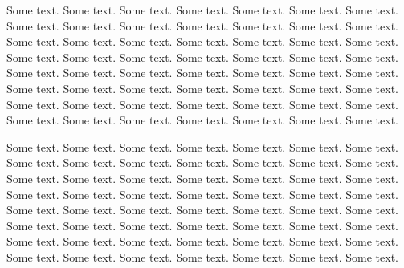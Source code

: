 \documentclass[oneside]{book}
\begin{document}
Some text. Some text. Some text. Some text. Some text. Some text. Some text. Some text. Some text. Some text. Some text. Some text. Some text. Some text. Some text. Some text. Some text. Some text. Some text. Some text. Some text. Some text. Some text. Some text. Some text. Some text. Some text. Some text. Some text. Some text. Some text. Some text. Some text. Some text. Some text. Some text. Some text. Some text. Some text. Some text. Some text. Some text. Some text. Some text. Some text. Some text. Some text. Some text. Some text. Some text. Some text. Some text. Some text. Some text. Some text. Some text. 

Some text. Some text. Some text. Some text. Some text. Some text. Some text. Some text. Some text. Some text. Some text. Some text. Some text. Some text. Some text. Some text. Some text. Some text. Some text. Some text. Some text. Some text. Some text. Some text. Some text. Some text. Some text. Some text. Some text. Some text. Some text. Some text. Some text. Some text. Some text. Some text. Some text. Some text. Some text. Some text. Some text. Some text. Some text. Some text. Some text. Some text. Some text. Some text. Some text. Some text. Some text. Some text. Some text. Some text. Some text. Some text. 
\end{document}
